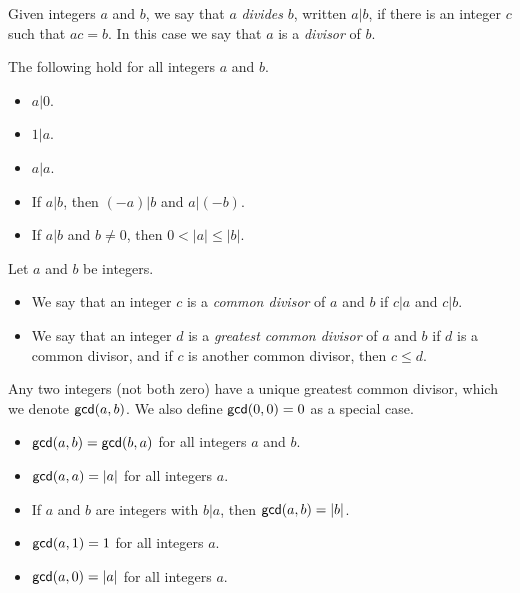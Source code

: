\begin{dfn}[Divides]
Given integers \(a\) and \(b\), we say that \(a\) \emph{divides} \(b\), written \(a|b\), if there is an integer \(c\) such that \(ac = b\).
In this case we say that \(a\) is a \emph{divisor} of \(b\).
\end{dfn}

\begin{prop}
The following hold for all integers \(a\) and \(b\).
\begin{itemize}
\item \(a|0\).
\item \(1|a\).
\item \(a|a\).
\item If \(a|b\), then \((-a)|b\) and \(a|(-b)\).
\item If \(a|b\) and \(b \neq 0\), then \(0 < |a| \leq |b|\).
\end{itemize}
\end{prop}

\begin{dfn}
Let \(a\) and \(b\) be integers.
\begin{itemize}
\item We say that an integer \(c\) is a \emph{common divisor} of \(a\) and \(b\) if \(c|a\) and \(c|b\).
\item We say that an integer \(d\) is a \emph{greatest common divisor} of \(a\) and \(b\) if \(d\) is a common divisor, and if \(c\) is another common divisor, then \(c \leq d\).
\end{itemize}
\end{dfn}

\begin{prop}
Any two integers (not both zero) have a unique greatest common divisor, which we denote \(\mathsf{gcd}(a, b)\). We also define \(\mathsf{gcd}(0, 0) = 0\) as a special case.
\end{prop}

\begin{prop} \mbox{}
\begin{itemize}
\item \(\mathsf{gcd}(a, b) = \mathsf{gcd}(b, a)\) for all integers \(a\) and \(b\).
\item \(\mathsf{gcd}(a, a) = |a|\) for all integers \(a\).
\item If \(a\) and \(b\) are integers with \(b|a\), then \(\mathsf{gcd}(a, b) = |b|\).
\item \(\mathsf{gcd}(a, 1) = 1\) for all integers \(a\).
\item \(\mathsf{gcd}(a, 0) = |a|\) for all integers \(a\).
\end{itemize}
\end{prop}

